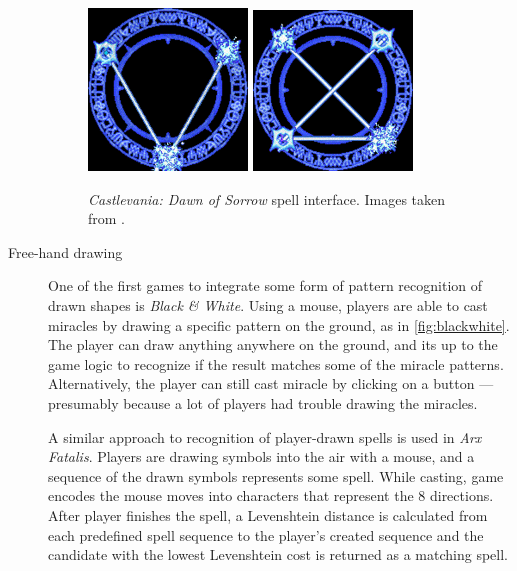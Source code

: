 \begin{description}
\begin{figure}
\centering
\includegraphics[width=.3\linewidth]{ext/castlevania.png}
\quad
\includegraphics[width=.3\linewidth]{ext/castlevania2.png}
\caption{\emph{Castlevania: Dawn of Sorrow} spell interface. Images taken from \citet{castlevania}.}
\label{fig:castlevania} %
\end{figure}

\item[Free-hand drawing]
One of the first games to integrate some form of pattern recognition of drawn shapes is \emph{Black \& White}. Using a mouse, players are able to cast miracles by drawing a specific pattern on the ground, as in \cref{fig:blackwhite}. The player can draw anything anywhere on the ground, and its up to the game logic to recognize if the result matches some of the miracle patterns. Alternatively, the player can still cast miracle by clicking on a button --- presumably because a lot of players had trouble drawing the miracles.

A similar approach to recognition of player-drawn spells is used in \emph{Arx Fatalis}. Players are drawing symbols into the air with a mouse, and a sequence of the drawn symbols represents some spell. While casting, game encodes the mouse moves into characters that represent the 8 directions. After player finishes the spell, a Levenshtein distance is calculated from each predefined spell sequence to the player's created sequence and the candidate with the lowest Levenshtein cost is returned as a matching spell.


\end{description}
